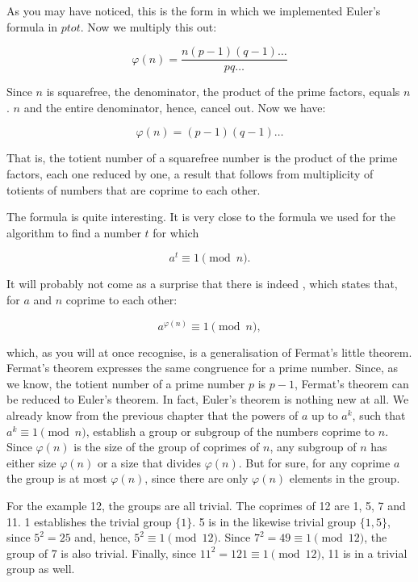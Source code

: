 \documentclass[tikz]{scrreprt}
\newcommand{\Varid}[1]{\mathit{#1}}
\begin{document}
As you may have noticed,
this is the form in which we implemented Euler's formula in \ensuremath{\Varid{ptot}}.
Now we multiply this out:

\begin{equation}
\varphi(n) = \frac{n(p-1)(q-1)\dots}{pq\dots}
\end{equation}

Since $n$ is squarefree, the denominator,
the product of the prime factors, equals $n$.
$n$ and the entire denominator, hence,
cancel out. Now we have:

\begin{equation}
\varphi(n) = (p-1)(q-1)\dots
\end{equation}

That is, the totient number of a squarefree number
is the product of the prime factors, each one
reduced by one, a result that follows
from multiplicity of totients of numbers that are coprime
to each other.

The formula is quite interesting.
It is very close to the formula we used for the
 algorithm to find a number $t$
for which

\[
a^t \equiv 1 \pmod{n}.
\]

It will probably not come as a surprise 
that there is indeed ,
which states that, for $a$ and $n$ coprime
to each other:

\begin{equation}
a^{\varphi(n)} \equiv 1 \pmod{n},
\end{equation}

which, as you will at once recognise,
is a generalisation of Fermat's little theorem.
Fermat's theorem expresses the same congruence
for a prime number. Since, as we know,
the totient number of a prime number $p$
is $p-1$, Fermat's theorem can be reduced
to Euler's theorem.
In fact, Euler's theorem is nothing new at all.
We already know from the previous chapter
that the powers of $a$ up to $a^k$,
such that $a^k \equiv 1 \pmod{n}$,
establish a group or subgroup of the numbers
coprime to $n$.
Since $\varphi(n)$ is the size of the group
of coprimes of $n$, any subgroup of $n$
has either size $\varphi(n)$ or a size
that divides $\varphi(n)$.
But for sure, for any coprime $a$ the group
is at most $\varphi(n)$, since there are only
$\varphi(n)$ elements in the group.

For the example 12, the groups are all trivial.
The coprimes of 12 are 1, 5, 7 and 11.
1 establishes the trivial group $\lbrace 1\rbrace$.
5 is in the likewise trivial group $\lbrace 1,5\rbrace$,
since $5^2 = 25$ and, hence, $5^2 \equiv 1 \pmod{12}$.
Since $7^2 = 49 \equiv 1 \pmod{12}$, the group of
7 is also trivial. Finally, since $11^2 = 121 \equiv 1 \pmod{12}$,
11 is in a trivial group as well.
\end{document}
